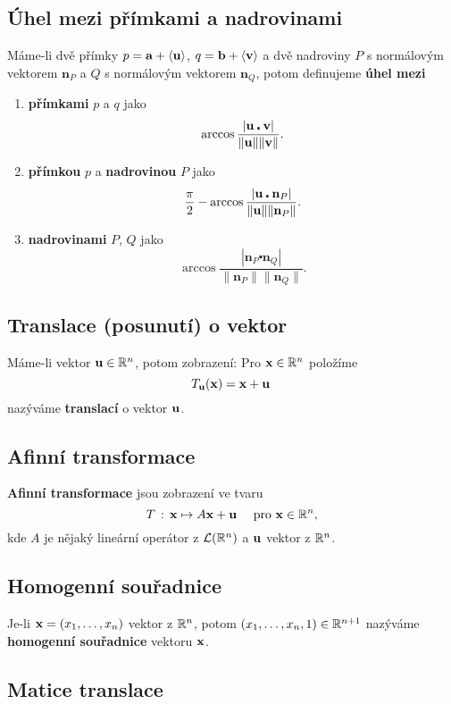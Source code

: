 \subsection*{Úhel mezi přímkami a nadrovinami}

Máme-li dvě přímky $p=\mathbf{a} + \langle \mathbf{u} \rangle$, $q=\mathbf{b}+\langle \mathbf{v} \rangle$ a
dvě nadroviny $P$ s normálovým vektorem $\mathbf n_P$ a $Q$ s normálovým
vektorem $\mathbf n_Q$, potom definujeme \textbf{úhel mezi}

\begin{enumerate}
	\item \textbf{přímkami} $p$ a $q$ jako
	      \[ \arccos\frac{|\mathbf{u}\centerdot \mathbf{v}|}{\|\mathbf{u}\|\|\mathbf{v}\|}. \]
	\item  \textbf{přímkou} $p$ a \textbf{nadrovinou} $P$ jako
	      \[ \frac{\pi}{2}-\arccos\frac{|\mathbf{u}\centerdot \mathbf n_P|}{\|\mathbf{u}\|\|\mathbf n_P\|}. \]
	\item \textbf{nadrovinami} $P$, $Q$ jako
	      \[ \arccos\frac{|\mathbf n_P\centerdot \mathbf n_Q|}{\|\mathbf n_P\|\|\mathbf n_Q\|}. \]
\end{enumerate}

\subsection*{Translace (posunutí) o vektor}

Máme-li vektor $\mathbf{u}\in \mathbb{R}^n$, potom zobrazení: Pro $\mathbf{x}\in \mathbb{R}^n$ položíme
\[ T_{\mathbf{u}}(\mathbf{x})= \mathbf{x}+\mathbf{u}\, \]
nazýváme \textbf{translací} o vektor $\mathbf{u} $.

\subsection*{Afinní transformace}

\textbf{Afinní transformace} jsou zobrazení ve tvaru
\[T\,:\, \mathbf{x}\mapsto A\mathbf{x}+\mathbf{u} \quad \text{ pro } \mathbf{x}\in \mathbb{R}^n,\]
kde $A$ je nějaký lineární operátor z $\mathcal L(\mathbb{R}^n)$ a $\mathbf{u}$ vektor z
$\mathbb{R}^n$.

\subsection*{Homogenní souřadnice}

Je-li $\mathbf{x}=(x_1,\dots,x_n)$ vektor z $\mathbb{R}^n$, potom $(x_1,\dots,x_n,1)\in
	\mathbb{R}^{n+1}$ nazýváme \textbf{homogenní souřadnice} vektoru $\mathbf{x}$.

\subsection*{Matice translace}

